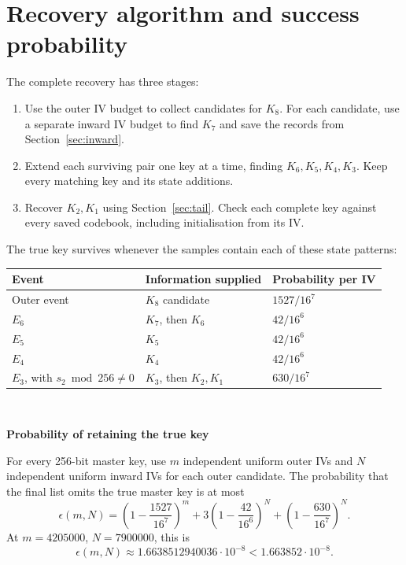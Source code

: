 \documentclass[11pt]{article}
\begin{document}
\section{Recovery algorithm and success probability}\label{sec:bounds}
The complete recovery has three stages:
\begin{enumerate}
\item Use the outer IV budget to collect candidates for \(K_8\).
For each candidate, use a separate inward IV budget to find \(K_7\)
and save the records from Section~\ref{sec:inward}.
\item Extend each surviving pair one key at a time, finding
\(K_6,K_5,K_4,K_3\). Keep every matching key and its state additions.
\item Recover \(K_2,K_1\) using Section~\ref{sec:tail}.
Check each complete key against every saved codebook,
including initialisation from its IV.
\end{enumerate}

The true key survives whenever the samples contain each of these
state patterns:
\begin{center}
\begin{tabular}{lll}
\toprule
Event & Information supplied & Probability per IV\\
\midrule
Outer event & \(K_8\) candidate & \(1527/16^7\)\\
\(E_6\) & \(K_7\), then \(K_6\) & \(42/16^6\)\\
\(E_5\) & \(K_5\) & \(42/16^6\)\\
\(E_4\) & \(K_4\) & \(42/16^6\)\\
\(E_3\), with \(s_2\bmod256\ne0\)
  & \(K_3\), then \(K_2,K_1\) & \(630/16^7\)\\
\bottomrule
\end{tabular}\\
\end{center}

\textbf{Probability of retaining the true key}

For every 256-bit master key, use \(m\) independent
uniform outer IVs and \(N\) independent uniform inward IVs
for each outer candidate. The probability that the final
list omits the true master key is at most
\begin{equation}
 \epsilon(m,N)
=\left(1-\frac{1527}{16^7}\right)^m
 +3\left(1-\frac{42}{16^6}\right)^N
 +\left(1-\frac{630}{16^7}\right)^N .
\label{eq:epsilon}
\end{equation}
At \(m=4205000\), \(N=7900000\), this is
\begin{equation}
             \epsilon(m,N)
             \approx1.6638512940036\cdot10^{-8}
             <1.663852\cdot10^{-8}.
\label{eq:number}
\end{equation}
\end{document}
